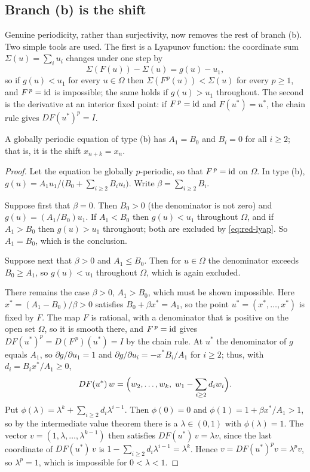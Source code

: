 \subsection{Branch (b) is the shift}

Genuine periodicity, rather than surjectivity, now removes the rest of branch
(b). Two simple tools are used. The first is a Lyapunov function: the
coordinate sum $\Sigma(u)=\sum_iu_i$ changes under one step by
\begin{equation}
\Sigma(F(u))-\Sigma(u)=g(u)-u_1 ,
\label{eq:red-lyap}
\end{equation}
so if $g(u)<u_1$ for every $u\in\Omega$ then $\Sigma(F^{\,p}(u))<\Sigma(u)$ for
every $p\ge1$, and $F^{\,p}=\mathrm{id}$ is impossible; the same holds if $g(u)>u_1$
throughout. The second is the derivative at an interior fixed point: if
$F^{\,p}=\mathrm{id}$ and $F(u^*)=u^*$, the chain rule gives $DF(u^*)^p=I$.

\begin{theorem}
\label{thm:red-shift}
A globally periodic equation of type (b) has $A_1=B_0$ and $B_i=0$ for all
$i\ge2$; that is, it is the shift $x_{n+k}=x_n$.
\end{theorem}

\begin{proof}
Let the equation be globally $p$-periodic, so that $F^{\,p}=\mathrm{id}$ on $\Omega$.
In type (b), $g(u)=A_1u_1/\bigl(B_0+\sum_{i\ge2}B_iu_i\bigr)$. Write
$\beta=\sum_{i\ge2}B_i$.

Suppose first that $\beta=0$. Then $B_0>0$ (the denominator is not zero) and
$g(u)=(A_1/B_0)u_1$. If $A_1<B_0$ then $g(u)<u_1$ throughout $\Omega$, and if
$A_1>B_0$ then $g(u)>u_1$ throughout; both are excluded by
\eqref{eq:red-lyap}. So $A_1=B_0$, which is the conclusion.

Suppose next that $\beta>0$ and $A_1\le B_0$. Then for $u\in\Omega$ the
denominator exceeds $B_0\ge A_1$, so $g(u)<u_1$ throughout $\Omega$, which is
again excluded.

There remains the case $\beta>0$, $A_1>B_0$, which must be shown impossible.
Here $x^*=(A_1-B_0)/\beta>0$ satisfies $B_0+\beta x^*=A_1$, so the point
$u^*=(x^*,\dots,x^*)$ is fixed by $F$. The map $F$ is rational, with a
denominator that is positive on the open set $\Omega$, so it is smooth there,
and $F^{\,p}=\mathrm{id}$ gives $DF(u^*)^p=D(F^{\,p})(u^*)=I$ by the chain
rule. At $u^*$ the denominator of $g$ equals $A_1$, so
$\partial g/\partial u_1=1$ and $\partial g/\partial u_i=-x^*B_i/A_1$ for
$i\ge2$; thus, with $d_i=B_ix^*/A_1\ge0$,
\[
DF(u^*)\,w=\Bigl(w_2,\dots,w_k,\;w_1-\sum_{i\ge2}d_iw_i\Bigr).
\]
Put $\phi(\lambda)=\lambda^k+\sum_{i\ge2}d_i\lambda^{i-1}$. Then $\phi(0)=0$
and $\phi(1)=1+\beta x^*/A_1>1$, so by the intermediate value theorem there is
a $\lambda\in(0,1)$ with $\phi(\lambda)=1$. The vector
$v=(1,\lambda,\dots,\lambda^{k-1})$ then satisfies $DF(u^*)\,v=\lambda v$,
since the last coordinate of $DF(u^*)\,v$ is
$1-\sum_{i\ge2}d_i\lambda^{i-1}=\lambda^k$. Hence $v=DF(u^*)^pv=\lambda^pv$,
so $\lambda^p=1$, which is impossible for $0<\lambda<1$.
\end{proof}

